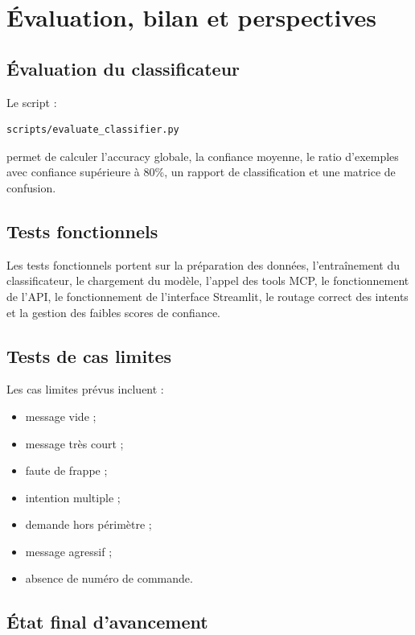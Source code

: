 \documentclass[12pt,a4paper]{report}
\begin{document}
\chapter{Évaluation, bilan et perspectives}

\section{Évaluation du classificateur}

Le script :

\begin{lstlisting}
scripts/evaluate_classifier.py
\end{lstlisting}

permet de calculer l'accuracy globale, la confiance moyenne, le ratio d'exemples avec confiance supérieure à 80\%, un rapport de classification et une matrice de confusion.

\section{Tests fonctionnels}

Les tests fonctionnels portent sur la préparation des données, l'entraînement du classificateur, le chargement du modèle, l'appel des tools MCP, le fonctionnement de l'API, le fonctionnement de l'interface Streamlit, le routage correct des intents et la gestion des faibles scores de confiance.

\section{Tests de cas limites}

Les cas limites prévus incluent :

\begin{itemize}
    \item message vide ;
    \item message très court ;
    \item faute de frappe ;
    \item intention multiple ;
    \item demande hors périmètre ;
    \item message agressif ;
    \item absence de numéro de commande.
\end{itemize}

\section{État final d'avancement}
\end{document}
